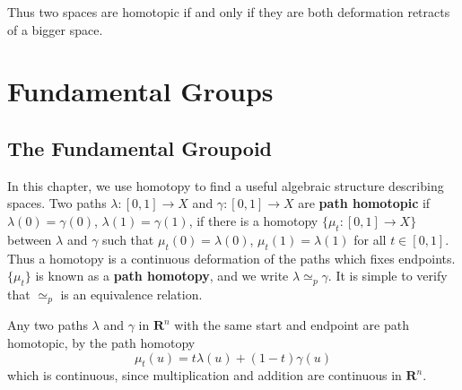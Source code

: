 Thus two spaces are homotopic if and only if they are both deformation retracts of a bigger space.







\chapter{Fundamental Groups}

\section{The Fundamental Groupoid}

In this chapter, we use homotopy to find a useful algebraic structure describing spaces. Two paths $\lambda:[0,1] \to X$ and $\gamma:[0,1] \to X$ are {\bf path homotopic} if $\lambda(0) = \gamma(0)$, $\lambda(1) = \gamma(1)$, if there is a homotopy $\{ \mu_t: [0,1] \to X \}$ between $\lambda$ and $\gamma$ such that $\mu_t(0) = \lambda(0)$, $\mu_t(1) = \lambda(1)$ for all $t \in [0,1]$. Thus a homotopy is a continuous deformation of the paths which fixes endpoints. $\{ \mu_t \}$ is known as a {\bf path homotopy}, and we write $\lambda \simeq_p \gamma$. It is simple to verify that $\simeq_p$ is an equivalence relation.

\begin{example}
    Any two paths $\lambda$ and $\gamma$ in $\mathbf{R}^n$ with the same start and endpoint are path homotopic, by the path homotopy
    \[ \mu_t(u) = t \lambda(u) + (1 - t) \gamma(u) \]
    which is continuous, since multiplication and addition are continuous in $\mathbf{R}^n$.
\end{example}

